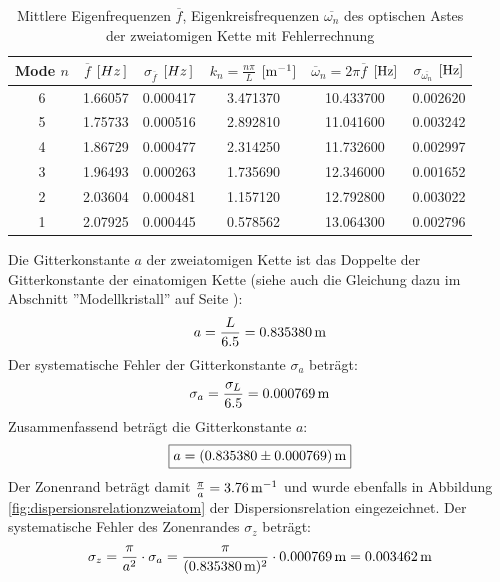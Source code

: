 \documentclass[a4paper,titlepage]{scrartcl}
\numberwithin{equation}{section}
\begin{document}
\begin{table}[H]
\centering
\begin{tabular}{c|c|c|c|c|c}
Mode $n$ & $\overline{f}$ $[\unit[Hz]]$ & $\sigma_{\overline{f}}$ $[\unit[Hz]]$ & $k_n=\frac{n \pi}{L}$ $[\unit[]{m^{-1}}]$ & $\overline{\omega}_n=2 \pi \overline{f}$ $[\unit[]{Hz}]$ & $\sigma_{\overline{\omega_n}}$ $[\unit[]{Hz}]$\\
\hline
6 & 1.66057 & 0.000417 & 3.471370 & 10.433700 & 0.002620\\
5 & 1.75733 & 0.000516 & 2.892810 & 11.041600 & 0.003242\\
4 & 1.86729 & 0.000477 & 2.314250 & 11.732600 & 0.002997\\
3 & 1.96493 & 0.000263 & 1.735690 & 12.346000 & 0.001652\\
2 & 2.03604 & 0.000481 & 1.157120 & 12.792800 & 0.003022\\
1 & 2.07925 & 0.000445 & 0.578562 & 13.064300 & 0.002796
\end{tabular}
\caption{Mittlere Eigenfrequenzen $\overline{f}$, Eigenkreisfrequenzen $\overline{\omega_n}$ des optischen Astes der zweiatomigen Kette mit Fehlerrechnung}
\label{tab:zweiatomigoptisch}
\end{table}
Die Gitterkonstante $a$ der zweiatomigen Kette ist das Doppelte der Gitterkonstante der einatomigen Kette (siehe auch die Gleichung dazu im Abschnitt ''Modellkristall'' auf Seite \pageref{eq:zweiatommodell}):
\begin{equation*}
a=\frac{L}{6.5}=\unit[0.835380]{m}
\end{equation*}
Der systematische Fehler der Gitterkonstante $\sigma_a$ beträgt:
\begin{equation*}
\sigma_a=\frac{\sigma_L}{6.5}=\unit[0.000769]{m}
\end{equation*}
Zusammenfassend beträgt die Gitterkonstante $a$:
\begin{equation*}
\boxed{a=\unit[(0.835380 \pm 0.000769)]{m}}
\end{equation*}
Der Zonenrand beträgt damit $\frac{\pi}{a}=\unit[3.76]{m^{-1}}$ und wurde ebenfalls in Abbildung \ref{fig:dispersionsrelationzweiatom} der Dispersionsrelation eingezeichnet. Der systematische Fehler des Zonenrandes $\sigma_z$ beträgt:
\begin{equation*}
\sigma_z=\frac{\pi}{a^2} \cdot \sigma_a=\frac{\pi}{(\unit[0.835380]{m})^2} \cdot \unit[0.000769]{m}=\unit[0.003462]{m}
\end{equation*}
\end{document}
